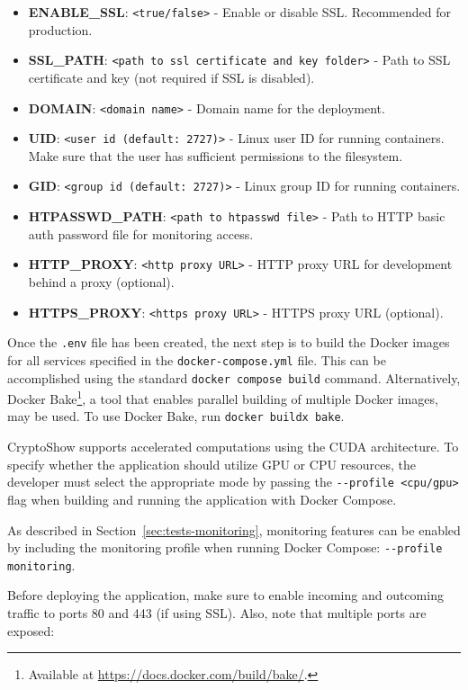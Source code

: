 \begin{itemize}
    \item \textbf{ENABLE\_SSL}: \lstinline|<true/false>| - Enable or disable SSL. Recommended for production.
    \item \textbf{SSL\_PATH}: \lstinline|<path to ssl certificate and key folder>| - Path to SSL certificate and key (not required if SSL is disabled).
    \item \textbf{DOMAIN}: \lstinline|<domain name>| - Domain name for the deployment.
    \item \textbf{UID}: \lstinline|<user id (default: 2727)>| - Linux user ID for running containers. Make sure that the user has sufficient permissions to the filesystem.
    \item \textbf{GID}: \lstinline|<group id (default: 2727)>| - Linux group ID for running containers.
    \item \textbf{HTPASSWD\_PATH}: \lstinline|<path to htpasswd file>| - Path to HTTP basic auth password file for monitoring access.
    \item \textbf{HTTP\_PROXY}: \lstinline|<http proxy URL>| - HTTP proxy URL for development behind a proxy (optional).
    \item \textbf{HTTPS\_PROXY}: \lstinline|<https proxy URL>| - HTTPS proxy URL (optional).
\end{itemize}

Once the \lstinline|.env| file has been created, the next step is to build the Docker images for all services specified in the \lstinline|docker-compose.yml| file. This can be accomplished using the standard \lstinline|docker compose build| command. Alternatively, Docker Bake\footnote{Available at \url{https://docs.docker.com/build/bake/}.}, a tool that enables parallel building of multiple Docker images, may be used. To use Docker Bake, run \lstinline|docker buildx bake|.

CryptoShow supports accelerated computations using the CUDA architecture. To specify whether the application should utilize GPU or CPU resources, the developer must select the appropriate mode by passing the \lstinline|--profile <cpu/gpu>| flag when building and running the application with Docker Compose.

As described in Section~\ref{sec:tests-monitoring}, monitoring features can be enabled by including the monitoring profile when running Docker Compose: \lstinline|--profile monitoring|.

Before deploying the application, make sure to enable incoming and outcoming traffic to ports 80 and 443 (if using SSL). Also, note that multiple ports are exposed:

